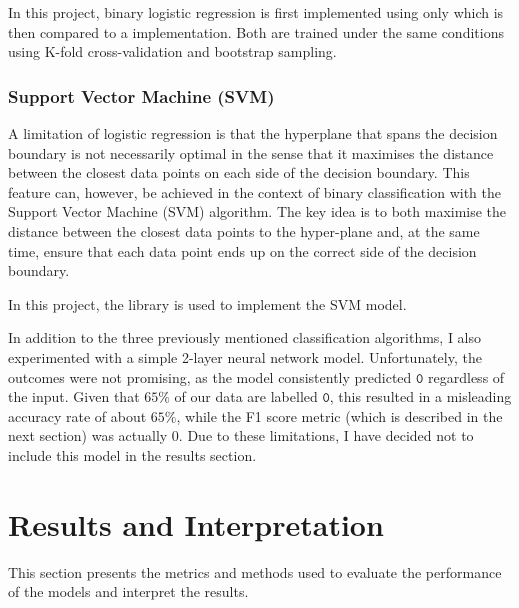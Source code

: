 \documentclass[12pt]{article}
\begin{document}
In this project, binary logistic regression is first implemented using only \cite{numpy-website} which is then compared to a \cite{sklearn-logisticregression} implementation. 
Both are trained under the same conditions using K-fold cross-validation and bootstrap sampling.


\subsubsection{Support Vector Machine (SVM)\cite{BenningPerra2023}}

\indent A limitation of logistic regression is that the hyperplane that spans the decision boundary is not necessarily optimal in the sense that it maximises the distance between the closest data points on each side of the decision boundary. 
This feature can, however, be achieved in the context of binary classification with the Support Vector Machine (SVM) algorithm. The key idea is to both maximise the distance between %
the closest data points to the hyper-plane and, at the same time, ensure that each data point ends up on the correct side of the decision boundary.


In this project, the \cite{sklearn_svm} library is used to implement the SVM model.



\vspace{12pt}

In addition to the three previously mentioned classification algorithms, I also experimented with a simple 2-layer neural network model. Unfortunately, the outcomes were not promising, as the model consistently predicted \( \mathtt{0} \) regardless of the input. Given that \( 65\% \) of our data are labelled \( \mathtt{0} \), this resulted in a misleading accuracy rate of about \( 65\% \), while the F1 score metric (which is described in the next section) was actually \( 0 \). Due to these limitations, I have decided not to include this model in the results section.



\section{Results and Interpretation}



This section presents the metrics and methods used to evaluate the performance of the models and interpret the results.
\end{document}
